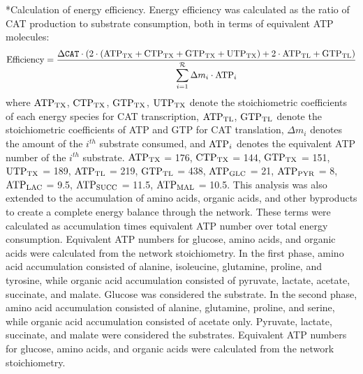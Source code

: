 \documentclass[12pt]{article}
\makeatletter
\renewcommand\subsection{\@startsection
	{subsection}{2}{0mm}
	{-0.05in}
	{-0.5\baselineskip}
	{\normalfont\normalsize\bfseries}}
\makeatother
\begin{document}
\subsection*{Calculation of energy efficiency.}
Energy efficiency was calculated as the ratio of CAT production to substrate consumption, both in terms of equivalent ATP molecules:
\begin{equation}\label{eqn:energy-efficiency-definition}
	{\rm Efficiency}=\frac{\Delta\texttt{CAT}\cdot \left(2\cdot\left(\rm {ATP}_{TX}+\rm {CTP}_{TX}+\rm {GTP}_{TX}+\rm {UTP}_{TX}\right)+\rm2\cdot\rm {ATP}_{TL}+\rm {GTP}_{TL}\right)}{\displaystyle\sum_{i=1}^{\mathcal{R}}\Delta m_{i}\cdot {\rm ATP}_i}
\end{equation}
where $\rm {ATP}_{TX}$, $\rm {CTP}_{TX}$, $\rm {GTP}_{TX}$, $\rm {UTP}_{TX}$ denote the stoichiometric coefficients of each energy species for CAT transcription, $\rm {ATP}_{TL}$, $\rm {GTP}_{TL}$ denote the stoichiometric coefficients of ATP and GTP for CAT translation, $\Delta m_{i}$ denotes the amount of the $i^{th}$ substrate consumed, and ${\rm ATP}_i$ denotes the equivalent ATP number of the $i^{th}$ substrate.
$\rm {ATP}_{TX}$ = 176, $\rm {CTP}_{TX}$ = 144, $\rm {GTP}_{TX}$ = 151, $\rm {UTP}_{TX}$ = 189, $\rm {ATP}_{TL}$ = 219, $\rm {GTP}_{TL}$ = 438, $\rm {ATP}_{GLC}$ = 21, $\rm {ATP}_{PYR}$ = 8, $\rm {ATP}_{LAC}$ = 9.5, $\rm {ATP}_{SUCC}$ = 11.5, $\rm {ATP}_{MAL}$ = 10.5.
This analysis was also extended to the accumulation of amino acids, organic acids, and other byproducts to create a complete energy balance through the network.
These terms were calculated as accumulation times equivalent ATP number over total energy consumption.
Equivalent ATP numbers for glucose, amino acids, and organic acids were calculated from the network stoichiometry.
In the first phase, amino acid accumulation consisted of alanine, isoleucine, glutamine, proline, and tyrosine, while organic acid accumulation consisted of pyruvate, lactate, acetate, succinate, and malate.
Glucose was considered the substrate.
In the second phase, amino acid accumulation consisted of alanine, glutamine, proline, and serine, while organic acid accumulation consisted of acetate only.
Pyruvate, lactate, succinate, and malate were considered the substrates.
Equivalent ATP numbers for glucose, amino acids, and organic acids were calculated from the network stoichiometry.
\end{document}
